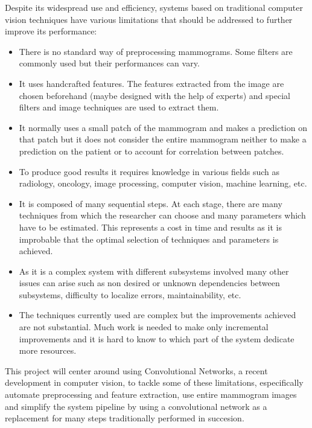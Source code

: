 Despite its widespread use and efficiency, systems based on traditional computer vision techniques have various limitations that should be addressed to further improve its performance:
\begin{itemize}
	\item There is no standard way of preprocessing mammograms. Some filters are commonly used but their performances can vary.
	\item It uses handcrafted features. The features extracted from the image are chosen beforehand (maybe designed with the help of experts) and special filters and image techniques are used to extract them.
	\item It normally uses a small patch of the mammogram and makes a prediction on that patch but it does not consider the entire mammogram neither to make a prediction on the patient or to account for correlation between patches.
	\item To produce good results it requires knowledge in various fields such as radiology, oncology, image processing, computer vision, machine learning, etc.
	\item It is composed of many sequential steps. At each stage, there are many techniques from which the researcher can choose and many parameters which have to be estimated. This represents a cost in time and results as it is improbable that the optimal selection of techniques and parameters is achieved.
	\item As it is a complex system with different subsystems involved many other issues can arise such as non desired or unknown dependencies between subsystems, difficulty to localize errors, maintainability, etc.  
	\item The techniques currently used are complex but the improvements achieved are not substantial. Much work is needed to make only incremental improvements and it is hard to know to which part of the system dedicate more resources.
\end{itemize}

This project will center around using Convolutional Networks, a recent development in computer vision, to tackle some of these limitations, especifically automate preprocessing and feature extraction, use entire mammogram images and simplify the system pipeline by using a convolutional network as a replacement for many steps traditionally performed in succesion.

